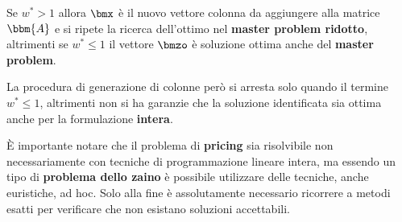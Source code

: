 \documentclass[\main/main.tex]{subfiles}
\begin{document}
Se \(w^* > 1\) allora \(\bmx \) è il nuovo vettore colonna da aggiungere alla matrice \(\bbm{A}\) e si ripete la ricerca dell'ottimo nel \textbf{master problem ridotto}, altrimenti se \(w^* \leq 1\) il vettore \(\bmzo \) è soluzione ottima anche del \textbf{master problem}.

La procedura di generazione di colonne però si arresta solo quando il termine \(w^* \leq 1\), altrimenti non si ha garanzie che la soluzione identificata sia ottima anche per la formulazione \textbf{intera}.

È importante notare che il problema di \textbf{pricing} sia risolvibile non necessariamente con tecniche di programmazione lineare intera, ma essendo un tipo di \textbf{problema dello zaino} è possibile utilizzare delle tecniche, anche euristiche, ad hoc. Solo alla fine è assolutamente necessario ricorrere a metodi esatti per verificare che non esistano soluzioni accettabili.
\end{document}
